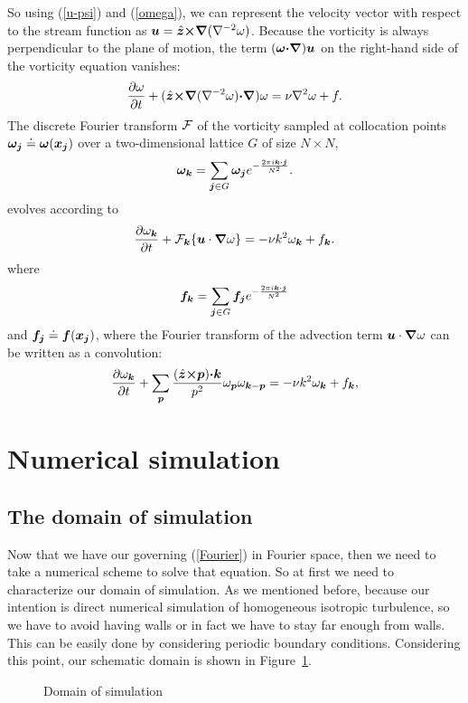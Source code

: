 \documentclass[12pt]{article}
\def\v{\bm}
\def\lap{{\nabla}^2}
\def\lapinv{{\nabla}^{-2}}
\def\vw{{\v\w}}
\def\Eq#1{(\ref{#1})}
\begin{document}
So using \Eq{u-psi} and \Eq{omega}, we can represent the velocity
vector with respect to the stream function as
$\vu=\hat{\vz}\cross\grad(\lapinv\omega)$.
Because the vorticity is always perpendicular to the plane of motion,
the term $(\vw\dot\grad)\vu$ on the right-hand side of the vorticity equation vanishes:
\begin{equation}\label{2D-vorticity-expand}
\frac{\partial \omega}{\partial t} + (\hat{\vz}\cross\grad(\lapinv\omega)\dot\grad)\omega= \nu\lap\omega + f.
\end{equation}
The discrete Fourier transform ${\cal F}$ of the vorticity sampled at collocation
points $\vw_\vj\doteq\vw(\vx_\vj)$ over a two-dimensional lattice
$G$ of size $N\times N$,
$$
\vw_{\vk}=\sum_{\vj\in G} \vw_\vj e^{-\fr{2\pi i\vk\dot\vj}{N^2}}.
$$
evolves according to
\begin{equation}\label{Fourier}
\frac{\partial\omega_{\vk}}{\partial t} + {\cal F}_\vk\{\vu\cdot\grad\omega\}= -\nu k^2\omega_{\vk} + f_{\vk}.
\end{equation}
where 
$$
\vf_{\vk}=\sum_{\vj\in G} \vf_\vj e^{-\fr{2\pi i\vk\dot\vj}{N^2}}
$$
and $\vf_\vj\doteq\vf(\vx_\vj)$,
where the Fourier transform of the advection term
$\vu\cdot\grad\omega$ can be written as a convolution:
\begin{equation}\label{Fourier-expand}
\frac{\partial\omega_{\vk}}{\partial t} + \sum_{\vp}{\frac{(\hat{\vz}\cross\vp)\dot\vk}{p^2}\omega_{\vp}\omega_{\vk-\vp}}= -\nu k^2\omega_{\vk} + f_{\vk},
\end{equation}

\section{Numerical simulation}
\subsection{The domain of simulation}
Now that we have our governing \Eq{Fourier} in Fourier space, then we need to take a numerical scheme to solve that equation. So at first we need to characterize our domain of simulation. As we mentioned before, because our intention is direct numerical simulation of homogeneous isotropic turbulence, so we have to avoid having walls or in fact we have to stay far enough from walls. This can be easily done by considering periodic boundary conditions. Considering this point, our schematic domain is shown in Figure~\ref{domain}. 
\begin{figure}[ht]
\begin{center}
\caption{Domain of simulation}\label{domain}
\end{center}
\end{figure}
\end{document}
